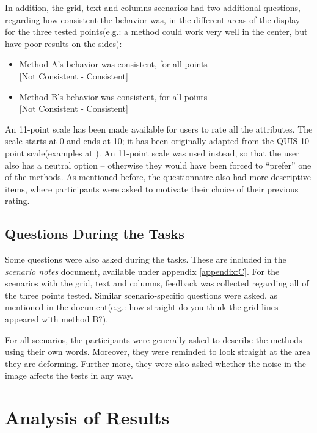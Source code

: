 \documentclass[]{article}
\begin{document}
In addition, the grid, text and columns scenarios had two additional questions, regarding how consistent the behavior was, in the different areas of the display - for the three tested points(e.g.: a method could work very well in the center, but have poor results on the sides):
\begin{itemize}
\item Method A's behavior was consistent, for all points \\{[Not Consistent - Consistent]}
\item Method B's behavior was consistent, for all points \\{[Not Consistent - Consistent]}
\end{itemize}

An 11-point scale has been made available for users to rate all the attributes. The scale starts at 0 and ends at 10; it has been originally adapted from the QUIS 10-point scale(examples at \cite{quis}). An 11-point scale was used instead, so that the user also has a neutral option – otherwise they would have been forced to “prefer” one of the methods. As mentioned before, the questionnaire also had more descriptive items, where participants were asked to motivate their choice of their previous rating.

\subsection{Questions During the Tasks}

Some questions were also asked during the tasks. These are included in the \textit{scenario notes} document, available under appendix \ref{appendix:C}. For the scenarios with the grid, text and columns, feedback was collected regarding all of the three points tested. Similar scenario-specific questions were asked, as mentioned in the document(e.g.: how straight do you think the grid lines appeared with method B?).

For all scenarios, the participants were generally asked to describe the methods using their own words. Moreover, they were reminded to look straight at the area they are deforming. Further more, they were also asked whether the noise in the image affects the tests in any way.

\newpage
\section{Analysis of Results}
\label{sec:Results}
\end{document}
